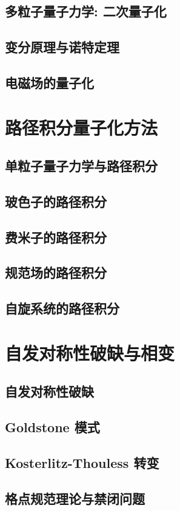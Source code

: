 \documentclass[b5paper]{book}
\begin{document}
\section{多粒子量子力学: 二次量子化}
\section{变分原理与诺特定理}
\section{电磁场的量子化}

\chapter{路径积分量子化方法}
\section{单粒子量子力学与路径积分}
\section{玻色子的路径积分}
\section{费米子的路径积分}
\section{规范场的路径积分}
\section{自旋系统的路径积分}

\chapter{自发对称性破缺与相变}
\section{自发对称性破缺}
\section{Goldstone 模式}
\section{Kosterlitz-Thouless 转变}
\section{格点规范理论与禁闭问题}%
\end{document}
